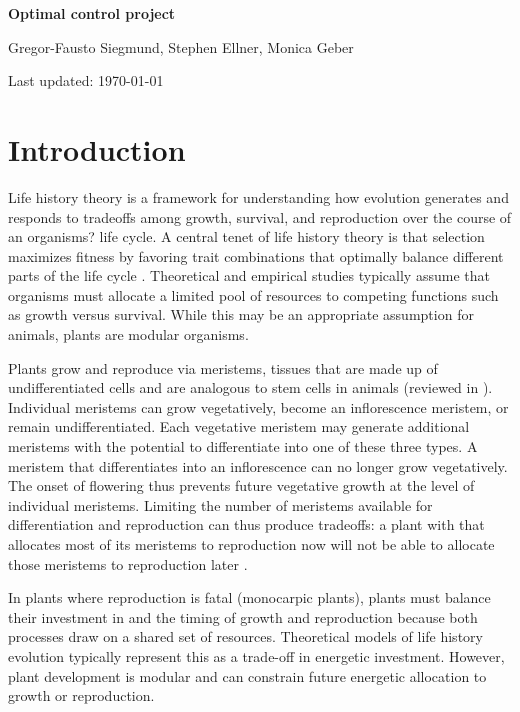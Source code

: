 \documentclass[12pt, oneside]{article}   	%
\begin{document}
 

\begin{titlepage}
   \begin{center}
       \vspace*{1cm}
 
       \textbf{Optimal control project}
 
       \vspace{1.5cm}
 
       Gregor-Fausto Siegmund, Stephen Ellner, Monica Geber
 
   	Last updated: \today
 
   \end{center}
\end{titlepage}
%

\section{Introduction}

Life history theory is a framework for understanding how evolution generates and responds to tradeoffs among growth, survival, and reproduction over the course of an organisms? life cycle. A central tenet of life history theory is that selection maximizes fitness by favoring trait combinations that optimally balance different parts of the life cycle \cite{Cole1954,Lande1983}. Theoretical and empirical studies typically assume that organisms must allocate a limited pool of resources to competing functions such as growth versus survival. While this may be an appropriate assumption for animals, plants are modular organisms.

Plants grow and reproduce via meristems, tissues that are made up of undifferentiated cells and are analogous to stem cells in animals (reviewed in \cite{Ward2004,Wang2018}). Individual meristems can grow vegetatively, become an inflorescence meristem, or remain undifferentiated. Each vegetative meristem may generate additional meristems with the potential to differentiate into one of these three types. A meristem that differentiates into an inflorescence can no longer grow vegetatively. The onset of flowering thus prevents future vegetative growth at the level of individual meristems. Limiting the number of meristems available for differentiation and reproduction can thus produce tradeoffs: a plant with that allocates most of its meristems to reproduction now will not be able to allocate those meristems to reproduction later \cite{Watson1984a,Geber1990}.

In plants where reproduction is fatal (monocarpic plants), plants must balance their investment in and the timing of growth and reproduction because both processes draw on a shared set of resources. Theoretical models of life history evolution typically represent this as a trade-off in energetic investment. However, plant development is modular and can constrain future energetic allocation to growth or reproduction.
\end{document}
